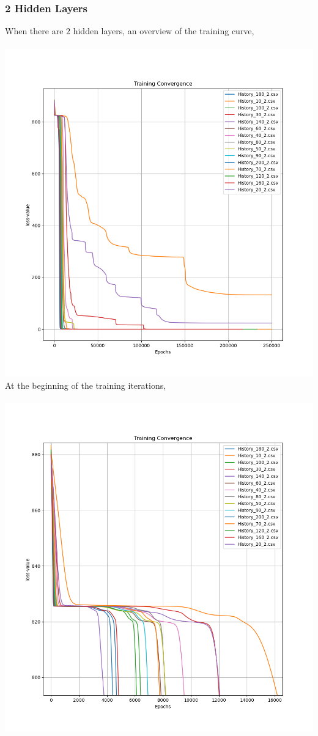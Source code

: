\documentclass[a4paper, 12pt]{report}
\def\size{0.75}
\begin{document}
\begin{center}
\subsubsection{2 Hidden Layers}
When there are $2$ hidden layers, an overview of the training curve,
\\~\\\includegraphics[scale=\size]{Depth_2_Overview.png}
\newpage
At the beginning of the training iterations,
\\~\\\includegraphics[scale=\size]{Depth_2_Beginning.png}

\end{center}
\end{document}

